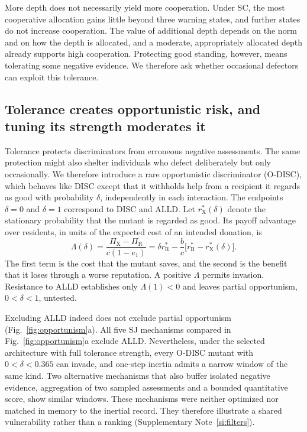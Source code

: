 \documentclass[fleqn,10pt]{wlscirep}
\newcommand{\rR}{r_{\mathrm{R}}^{*}}
\newcommand{\rX}{r_{\mathrm{X}}^{*}}
\theoremstyle{plain}
\begin{document}
More depth does not necessarily yield more cooperation. Under SC, the most cooperative allocation gains little beyond three warning states, and further states do not increase cooperation. The value of additional depth depends on the norm and on how the depth is allocated, and a moderate, appropriately allocated depth already supports high cooperation. Protecting good standing, however, means tolerating some negative evidence. We therefore ask whether occasional defectors can exploit this tolerance.

\subsection*{Tolerance creates opportunistic risk, and tuning its strength moderates it}

Tolerance protects discriminators from erroneous negative assessments. The same protection might also shelter individuals who defect deliberately but only occasionally. We therefore introduce a rare opportunistic discriminator (O-DISC), which behaves like DISC except that it withholds help from a recipient it regards as good with probability $\delta$, independently in each interaction. The endpoints $\delta=0$ and $\delta=1$ correspond to DISC and ALLD. Let $\rX(\delta)$ denote the stationary probability that the mutant is regarded as good. Its payoff advantage over residents, in units of the expected cost of an intended donation, is
\begin{equation}
\Lambda(\delta)=\frac{\Pi_{\mathrm X}-\Pi_{\mathrm R}}{c(1-e_1)}
=\delta\rR-\frac{b}{c}\bigl[\rR-\rX(\delta)\bigr].
\label{eq:lambda}
\end{equation}
The first term is the cost that the mutant saves, and the second is the benefit that it loses through a worse reputation. A positive $\Lambda$ permits invasion. Resistance to ALLD establishes only $\Lambda(1)<0$ and leaves partial opportunism, $0<\delta<1$, untested.

Excluding ALLD indeed does not exclude partial opportunism (Fig.~\ref{fig:opportunism}a). All five SJ mechanisms compared in Fig.~\ref{fig:opportunism}a exclude ALLD. Nevertheless, under the selected architecture with full tolerance strength, every O-DISC mutant with $0<\delta<0.365$ can invade, and one-step inertia admits a narrow window of the same kind. Two alternative mechanisms that also buffer isolated negative evidence, aggregation of two sampled assessments\cite{michelmata2024} and a bounded quantitative score\cite{schmid2023}, show similar windows. These mechanisms were neither optimized nor matched in memory to the inertial record. They therefore illustrate a shared vulnerability rather than a ranking (Supplementary Note~\ref{si:filters}).
\end{document}
